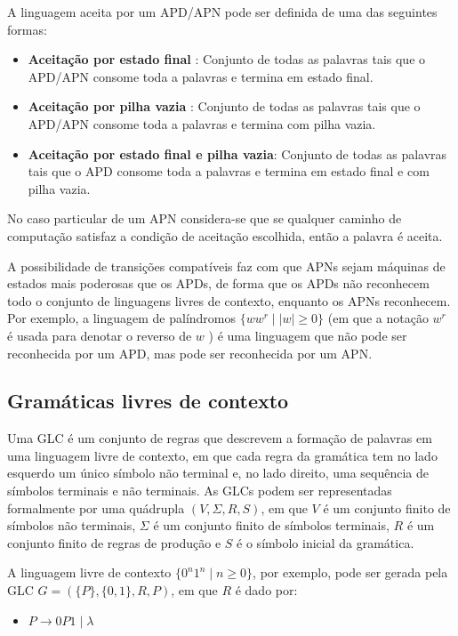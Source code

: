 A linguagem aceita por um APD/APN pode ser definida de uma das seguintes formas:
\begin{itemize}
 \item \textbf{Aceitação por estado final} : Conjunto de todas as palavras tais que o APD/APN consome toda a palavras e termina em estado final.
 \item \textbf{Aceitação por pilha vazia} : Conjunto de todas as palavras tais que o APD/APN consome toda a palavras e termina com pilha vazia.
 \item \textbf{Aceitação por estado final e pilha vazia}: Conjunto de todas as palavras tais que o APD consome toda a palavras e
       termina em estado final e com pilha vazia.
\end{itemize}

No caso particular de um APN considera-se que se qualquer caminho de computação satisfaz a condição de aceitação escolhida, então a palavra é aceita.

A possibilidade de transições compatíveis faz com que APNs sejam máquinas de estados mais poderosas que os APDs, de forma que os APDs não reconhecem todo o conjunto de linguagens livres de contexto, enquanto os APNs reconhecem. Por exemplo, a linguagem de palíndromos $\{ww^r \mid |w| \geq 0\}$ (em que a notação $w^r$ é usada para denotar o reverso de $w$ ) é uma linguagem que não pode ser reconhecida por um APD, mas pode ser reconhecida por um APN.

\subsection{Gramáticas livres de contexto}

Uma \ac{GLC} é um conjunto de regras que descrevem a formação de palavras em uma linguagem livre de contexto, em que cada regra da gramática tem no lado esquerdo um único símbolo não terminal e, no lado direito, uma sequência de símbolos terminais e não terminais. As GLCs podem ser representadas formalmente por uma quádrupla $(V, \Sigma, R, S)$, em que $V$ é um conjunto finito de símbolos não terminais, $\Sigma$ é um conjunto finito de símbolos terminais, $R$ é um conjunto finito de regras de produção e $S$ é o símbolo inicial da gramática.

A linguagem livre de contexto $\{0^n 1^n \mid n \geq 0\}$, por exemplo, pode ser gerada pela GLC $G = (\{P\}, \{0, 1\}, R, P)$, em que $R$ é dado por:
\begin{itemize}
    \item[] $P \to 0P1 \mid \lambda$
\end{itemize}

